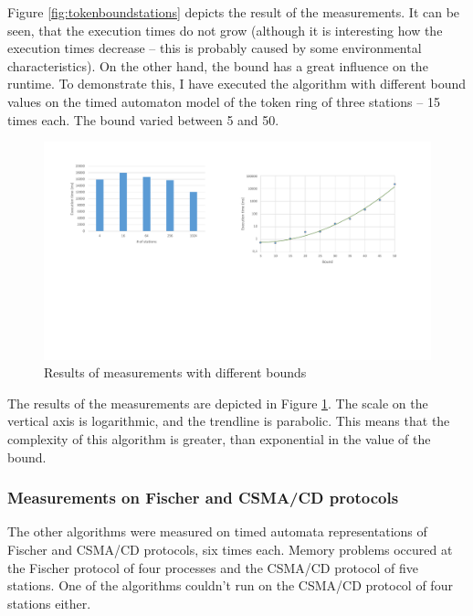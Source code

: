 Figure \ref{fig:tokenboundstations} depicts the result of the measurements. It can be seen, that the execution times do not grow (although it is interesting how the execution times decrease -- this is probably caused by some environmental characteristics). On the other hand, the bound has a great influence on the runtime. To demonstrate this, I have executed the algorithm with different bound values on the timed automaton model of the token ring of three stations -- 15 times each. The bound varied between 5 and 50.

\begin{figure}
	\centering
	\includegraphics[width=\textwidth]{include/figures/diag_bound}
	\caption{Results of measurements with different bounds}
	\label{fig:tokenbound}
\end{figure}

The results of the measurements are depicted in Figure \ref{fig:tokenbound}. The scale on the vertical axis is logarithmic, and the trendline is parabolic. This means that the complexity of this algorithm is greater, than exponential in the value of the bound.

\subsubsection{Measurements on Fischer and CSMA/CD protocols}

The other algorithms were measured on timed automata representations of Fischer and CSMA/CD protocols, six times each. Memory problems occured at the Fischer protocol of four processes and the CSMA/CD protocol of five stations. One of the algorithms couldn't run on the CSMA/CD protocol of four stations either.

